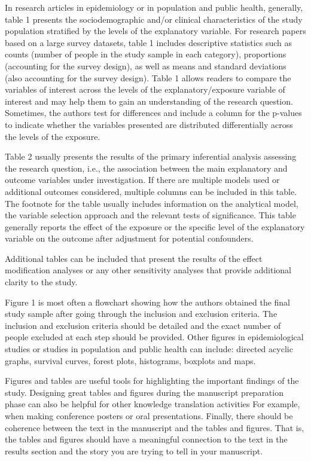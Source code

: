 \documentclass[
]{book}
\begin{document}
In research articles in epidemiology or in population and public health, generally, table 1 presents the sociodemographic and/or clinical characteristics of the study population stratified by the levels of the explanatory variable. For research papers based on a large survey datasets, table 1 includes descriptive statistics such as counts (number of people in the study sample in each category), proportions (accounting for the survey design), as well as means and standard deviations (also accounting for the survey design). Table 1 allows readers to compare the variables of interest across the levels of the explanatory/exposure variable of interest and may help them to gain an understanding of the research question. Sometimes, the authors test for differences and include a column for the p-values to indicate whether the variables presented are distributed differentially across the levels of the exposure.

Table 2 usually presents the results of the primary inferential analysis assessing the research question, i.e., the association between the main explanatory and outcome variables under investigation. If there are multiple models used or additional outcomes considered, multiple columns can be included in this table. The footnote for the table usually includes information on the analytical model, the variable selection approach and the relevant tests of significance. This table generally reports the effect of the exposure or the specific level of the explanatory variable on the outcome after adjustment for potential confounders.

Additional tables can be included that present the results of the effect modification analyses or any other sensitivity analyses that provide additional clarity to the study.

Figure 1 is most often a flowchart showing how the authors obtained the final study sample after going through the inclusion and exclusion criteria. The inclusion and exclusion criteria should be detailed and the exact number of people excluded at each step should be provided. Other figures in epidemiological studies or studies in population and public health can include: directed acyclic graphs, survival curves, forest plots, histograms, boxplots and maps.

Figures and tables are useful tools for highlighting the important findings of the study. Designing great tables and figures during the manuscript preparation phase can also be helpful for other knowledge translation activities For example, when making conference posters or oral presentations. Finally, there should be coherence between the text in the manuscript and the tables and figures. That is, the tables and figures should have a meaningful connection to the text in the results section and the story you are trying to tell in your manuscript.
\end{document}
